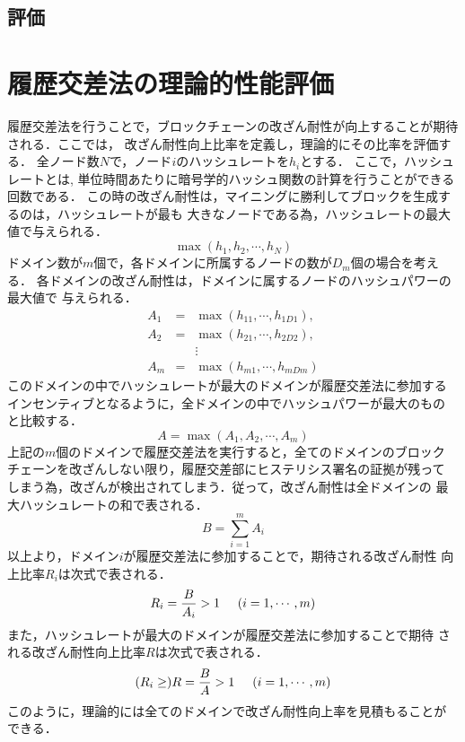 \documentclass[a4paper,12pt]{jsarticle}
\begin{document}
\newpage
\subsubsection{}



\newpage
\subsection{評価}
\section{履歴交差法の理論的性能評価}

履歴交差法を行うことで，ブロックチェーンの改ざん耐性が向上することが期待される．ここでは，
改ざん耐性向上比率を定義し，理論的にその比率を評価する．
全ノード数$N$で，ノード$i$のハッシュレートを$h_i$とする．
ここで，ハッシュレートとは, 単位時間あたりに暗号学的ハッシュ関数の計算を行うことができる
回数である．
この時の改ざん耐性は，マイニングに勝利してブロックを生成するのは，ハッシュレートが最も
大きなノードである為，ハッシュレートの最大値で与えられる．
%
\begin{equation}
  \max(h_1, h_2, \cdots, h_N)
\end{equation}
%
ドメイン数が$m$個で，各ドメインに所属するノードの数が$D_m$個の場合を考える．
各ドメインの改ざん耐性は，ドメインに属するノードのハッシュパワーの最大値で
与えられる．
%
\begin{eqnarray}
	A_1 &=& \max (h_{11}, \cdots ,h_{1D1}), \\
	A_2 &=& \max(h_{21}, \cdots ,h_{2D2}), \\
	    & & \vdots \nonumber \\
	A_m &=& \max(h_{m1}, \cdots ,h_{mDm})
\end{eqnarray}
%
このドメインの中でハッシュレートが最大のドメインが履歴交差法に参加する
インセンティブとなるように，全ドメインの中でハッシュパワーが最大のもの
と比較する．
%
\begin{equation}
A = \max(A_1, A_2, \cdots, A_m)
\end{equation}
%
上記の$m$個のドメインで履歴交差法を実行すると，全てのドメインのブロック
チェーンを改ざんしない限り，履歴交差部にヒステリシス署名の証拠が残って
しまう為，改ざんが検出されてしまう．従って，改ざん耐性は全ドメインの
最大ハッシュレートの和で表される．
%
\begin{equation}
	B = \sum_{i=1}^{m} A_i
\end{equation}
%
以上より，ドメイン$i$が履歴交差法に参加することで，期待される改ざん耐性
向上比率$R_i$は次式で表される．
%
\begin{equation}
	R_i = \frac{B}{A_i} > 1 \hspace{5mm} (i=1, \cdots, m)
\end{equation}
%
また，ハッシュレートが最大のドメインが履歴交差法に参加することで期待
される改ざん耐性向上比率$R$は次式で表される．
%
\begin{equation}
	(R_i \ge) R = \frac{B}{A} > 1  \hspace{5mm} (i=1, \cdots, m)
\end{equation}
%
このように，理論的には全てのドメインで改ざん耐性向上率を見積もることが
できる．
\end{document}
